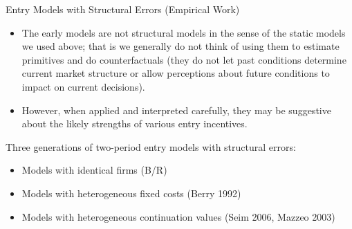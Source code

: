 \begin{frame}{Entry Models with Structural Errors (Empirical Work)}

\begin{itemize}

\item The early models are not structural models in the sense of the static models we used above; that is we generally do not think of using them to estimate primitives and do counterfactuals (they do not let past conditions determine current market structure or allow perceptions about future conditions to impact on current decisions). 
\item However, when applied and interpreted carefully, they may be suggestive about the likely strengths of various entry incentives.
\end{itemize}

Three generations of two-period entry models with structural errors:

\begin{itemize}
\item Models with identical firms (B/R)
\item Models with heterogeneous fixed costs (Berry 1992)
\item Models with heterogeneous continuation values (Seim 2006, Mazzeo 2003)
\end{itemize}



\end{frame}

























